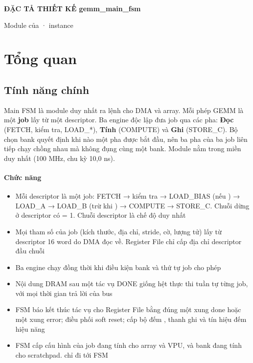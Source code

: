 \documentclass[10pt,a4paper]{article}
\begin{document}
{\Large\bfseries ĐẶC TẢ THIẾT KẾ gemm\_main\_fsm}\par
\vspace{2pt}
{\small\color{muted}Module của  · instance }\par
\tableofcontents
\clearpage

\section{Tổng quan}
\subsection{Tính năng chính}\label{sec:1}

Main FSM là module duy nhất ra lệnh cho DMA và array. Mỗi phép GEMM là một \textbf{job} lấy từ một descriptor. Ba engine độc lập đưa job qua các pha: \textbf{Đọc} (FETCH, kiểm tra, LOAD\_*), \textbf{Tính} (COMPUTE) và \textbf{Ghi} (STORE\_C). Bộ chọn bank quyết định khi nào một pha được bắt đầu, nên ba pha của ba job liên tiếp chạy chồng nhau mà không đụng cùng một bank. Module nằm trong miền  duy nhất (100 MHz, chu kỳ 10,0 ns).

\paragraph{Chức năng}\label{par:1-1}
\begin{itemize}
\item Mỗi descriptor là một job: FETCH → kiểm tra → LOAD\_BIAS (nếu ) → LOAD\_A → LOAD\_B (trừ khi ) → COMPUTE → STORE\_C. Chuỗi dừng ở descriptor có  = 1. Chuỗi descriptor là chế độ duy nhất
\item Mọi tham số của job (kích thước, địa chỉ, stride, cờ, lượng tử) lấy từ descriptor 16 word do DMA đọc về. Register File chỉ cấp địa chỉ descriptor đầu chuỗi 
\item Ba engine chạy đồng thời khi điều kiện bank và thứ tự job cho phép
\item Nội dung DRAM sau một tác vụ DONE giống hệt thực thi tuần tự từng job, với mọi thời gian trả lời của bus
\item FSM báo kết thúc tác vụ cho Register File bằng đúng một xung done hoặc một xung error; điều phối soft reset; cấp bộ đếm , thanh ghi  và tín hiệu đếm hiệu năng
\item FSM cấp cấu hình của job đang tính cho array và VPU, và bank đang tính cho scratchpad.  chỉ đi tới FSM
\end{itemize}
\end{document}
